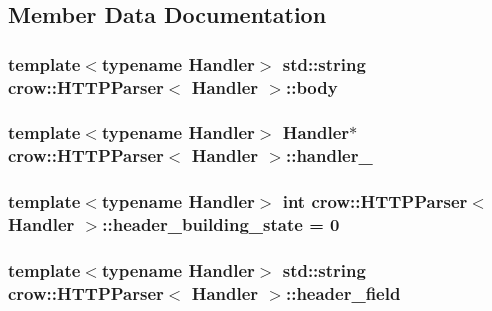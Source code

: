 \subsection{Member Data Documentation}
\hypertarget{structcrow_1_1_h_t_t_p_parser_a38b29e8668db22997d92a2040a40eb69}{
\subsubsection[{body}]{\setlength{\rightskip}{0pt plus 5cm}template$<$typename Handler$>$ std\-::string {\bf crow\-::\-H\-T\-T\-P\-Parser}$<$ Handler $>$\-::body}}\label{structcrow_1_1_h_t_t_p_parser_a38b29e8668db22997d92a2040a40eb69}
\hypertarget{structcrow_1_1_h_t_t_p_parser_a8c9ef70473ed6548872bcb217965203e}{
\subsubsection[{handler\-\_\-}]{\setlength{\rightskip}{0pt plus 5cm}template$<$typename Handler$>$ Handler$\ast$ {\bf crow\-::\-H\-T\-T\-P\-Parser}$<$ Handler $>$\-::handler\-\_\-}}\label{structcrow_1_1_h_t_t_p_parser_a8c9ef70473ed6548872bcb217965203e}
\hypertarget{structcrow_1_1_h_t_t_p_parser_af66d21628557efe1b854e05bb2512c84}{
\subsubsection[{header\-\_\-building\-\_\-state}]{\setlength{\rightskip}{0pt plus 5cm}template$<$typename Handler$>$ int {\bf crow\-::\-H\-T\-T\-P\-Parser}$<$ Handler $>$\-::header\-\_\-building\-\_\-state = 0}}\label{structcrow_1_1_h_t_t_p_parser_af66d21628557efe1b854e05bb2512c84}
\hypertarget{structcrow_1_1_h_t_t_p_parser_ac30b845f7195341f9c2892e0fd428c31}{
\subsubsection[{header\-\_\-field}]{\setlength{\rightskip}{0pt plus 5cm}template$<$typename Handler$>$ std\-::string {\bf crow\-::\-H\-T\-T\-P\-Parser}$<$ Handler $>$\-::header\-\_\-field}}\label{structcrow_1_1_h_t_t_p_parser_ac30b845f7195341f9c2892e0fd428c31}

